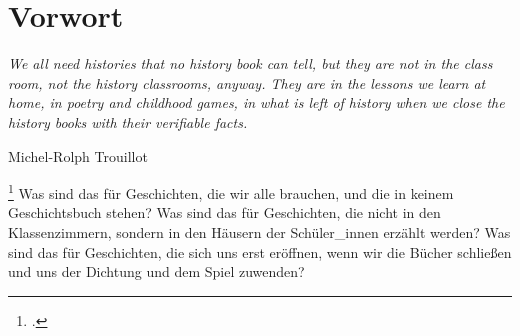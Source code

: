 \section{Vorwort}


\epigraph{\textit{We all need histories that no history book can tell, but they
    are not in the class room, not the history classrooms, anyway.  They are in
    the lessons we learn at home, in poetry and childhood games, in what is left
    of history when we close the history books with their verifiable
facts.}}{Michel-Rolph Trouillot \footnotemark} \footcitetext{troillot} Was sind
das für Geschichten, die wir alle brauchen, und die in keinem Geschichtsbuch
stehen? Was sind das für Geschichten, die nicht in den Klassenzimmern, sondern
in den Häusern der Schüler\_innen erzählt werden? Was sind das für Geschichten,
die sich uns erst eröffnen, wenn wir die Bücher schließen und uns der Dichtung
und dem Spiel zuwenden?

